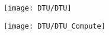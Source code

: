 \begin{center}
	\begin{minipage}{150mm}
		\texttt{[image: DTU/DTU]}
	\end{minipage}
	\begin{minipage}{800mm}
		\maketitle
	\end{minipage}
	\begin{minipage}{150mm}
		\texttt{[image: DTU/DTU\_Compute]}
	\end{minipage}
\end{center}

\vspace*{\onelineskip}

